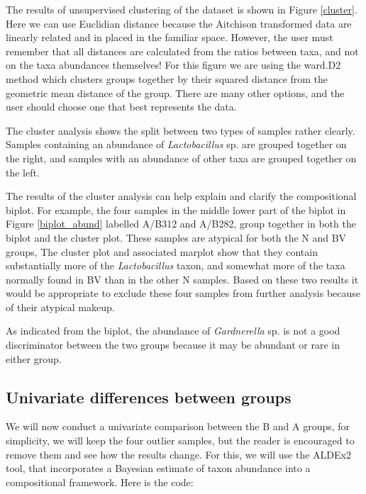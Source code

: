 \documentclass[11pt]{article}\usepackage[]{graphicx}\usepackage[]{color}
\begin{document}
The results of unsupervised clustering of the dataset is shown in Figure \ref{cluster}. Here we can use Euclidian distance because the Aitchison transformed data are linearly related and in placed in the familiar space. However, the user must remember that all distances are calculated from the ratios between taxa, and not on the taxa abundances themselves! For this figure we are using the ward.D2 method which clusters groups together by their squared distance from the geometric mean distance of the group. There are many other options, and the user should choose one that best represents the data. 

The cluster analysis shows the split between two types of samples rather clearly. Samples containing an abundance of \emph{Lactobacillus} sp. are grouped together on the right, and samples with an abundance of other taxa are grouped together on the left. 

The results of the cluster analysis can help explain and clarify the compositional biplot. For example, the four samples in the middle lower part of the biplot in Figure \ref{biplot_abund} labelled A/B312 and A/B282, group together in both the biplot and the cluster plot. These samples are atypical for both the N and BV groups, The cluster plot and associated marplot show that they contain substantially more of the \emph{Lactobacillus} taxon, and somewhat more of the taxa normally found in BV than in the other N samples. Based on these two results it would be appropriate to exclude these four samples from further analysis because of their atypical makeup. 

As indicated from the biplot, the abundance of \emph{Gardnerella} sp. is not a good  discriminator between the  two groups because it may be abundant or rare in either group. 

\subsection{Univariate differences between groups}

We will now conduct a univariate comparison between the B and A groups, for simplicity, we will keep the four outlier samples, but the reader is encouraged to remove them and see how the results change. For this, we will use the ALDEx2 tool, that incorporates a Bayesian estimate of taxon abundance into a compositional framework. Here is the code:
\end{document}
